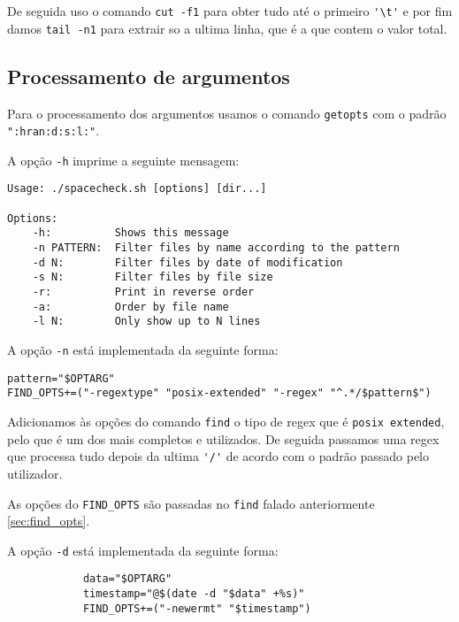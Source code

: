 De seguida uso o comando \texttt{cut -f1} para obter tudo até o
primeiro \Verb|'\t'| e por fim damos \texttt{tail -n1} para extrair
so a ultima linha, que é a que contem o valor total.

\subsection{Processamento de argumentos}

Para o processamento dos argumentos usamos o comando \texttt{getopts} com o padrão \texttt{":hran:d:s:l:"}.

A opção \Verb|-h| imprime a seguinte mensagem:

\begin{listing}[H]
\begin{verbatim}
Usage: ./spacecheck.sh [options] [dir...]

Options:
	-h:          Shows this message
	-n PATTERN:  Filter files by name according to the pattern
	-d N:        Filter files by date of modification
	-s N:        Filter files by file size
	-r:          Print in reverse order
	-a:          Order by file name
	-l N:        Only show up to N lines
\end{verbatim}
\end{listing}

A opção \Verb|-n| está implementada da seguinte forma:

\begin{listing}[H]
\begin{verbatim}
pattern="$OPTARG"
FIND_OPTS+=("-regextype" "posix-extended" "-regex" "^.*/$pattern$")
\end{verbatim}
\end{listing}

Adicionamos às opções do comando \texttt{find} o tipo de regex que é \Verb|posix extended|, pelo que é um dos mais completos e utilizados.
De seguida passamos uma regex que processa tudo depois da ultima \Verb|'/'| de acordo com o padrão passado pelo utilizador.

As opções do \Verb|FIND_OPTS| são passadas no \Verb|find| falado anteriormente \ref{sec:find_opts}.

A opção \Verb|-d| está implementada da seguinte forma:

\begin{listing}[H]
\begin{verbatim}
			data="$OPTARG"
			timestamp="@$(date -d "$data" +%s)"
			FIND_OPTS+=("-newermt" "$timestamp")
\end{verbatim}
\end{listing}

